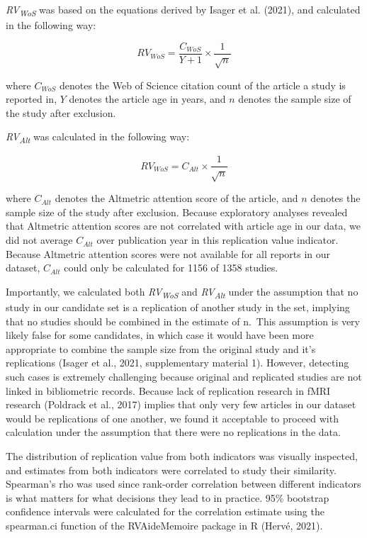 \documentclass[
  man,floatsintext]{apa6}
\begin{document}
\emph{RV\textsubscript{WoS}} was based on the equations derived by Isager et al. (2021), and calculated in the following way:

\begin{equation} 
  \tag{2}
  RV_{WoS} = \frac{C_{WoS}}{Y+1}\times\frac{1}{\sqrt{n}}
  \label{eq:2}
\end{equation}

where \(C_{WoS}\) denotes the Web of Science citation count of the article a study is reported in, \(Y\) denotes the article age in years, and \(n\) denotes the sample size of the study after exclusion.

\emph{RV\textsubscript{Alt}} was calculated in the following way:

\begin{equation} 
  \tag{3}
  RV_{WoS} = C_{Alt}\times\frac{1}{\sqrt{n}}
  \label{eq:3}
\end{equation}

where \(C_{Alt}\) denotes the Altmetric attention score of the article, and \(n\) denotes the sample size of the study after exclusion. Because exploratory analyses revealed that Altmetric attention scores are not correlated with article age in our data, we did not average \(C_{Alt}\) over publication year in this replication value indicator. Because Altmetric attention scores were not available for all reports in our dataset, \(C_{Alt}\) could only be calculated for 1156 of 1358 studies.

Importantly, we calculated both \emph{RV\textsubscript{WoS}} and \emph{RV\textsubscript{Alt}} under the assumption that no study in our candidate set is a replication of another study in the set, implying that no studies should be combined in the estimate of n.~This assumption is very likely false for some candidates, in which case it would have been more appropriate to combine the sample size from the original study and it's replications (Isager et al., 2021, supplementary material 1). However, detecting such cases is extremely challenging because original and replicated studies are not linked in bibliometric records. Because lack of replication research in fMRI research (Poldrack et al., 2017) implies that only very few articles in our dataset would be replications of one another, we found it acceptable to proceed with calculation under the assumption that there were no replications in the data.

The distribution of replication value from both indicators was visually inspected, and estimates from both indicators were correlated to study their similarity. Spearman's rho was used since rank-order correlation between different indicators is what matters for what decisions they lead to in practice. 95\% bootstrap confidence intervals were calculated for the correlation estimate using the spearman.ci function of the RVAideMemoire package in R (Hervé, 2021).
\end{document}
